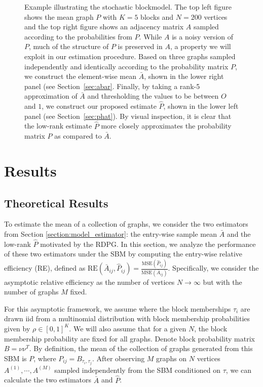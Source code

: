 \documentclass[10pt,letterpaper]{article}
\begin{document}
\begin{figure}
\begin{subfigure}{.4\textwidth}
\end{subfigure}
\caption{Example illustrating the stochastic blockmodel. The top left figure shows the mean graph $P$ with $K = 5$ blocks and $N=200$ vertices and the top right figure shows an adjacency matrix $A$ sampled according to the probabilities from $P$.
While $A$ is a noisy version of $P$, much of the structure of $P$ is preserved in $A$, a property we will exploit in our estimation procedure.
Based on three graphs sampled independently and identically according to the probability matrix $P$, we construct the element-wise mean $\bar{A}$, shown in the lower right panel (see Section~\ref{sec:abar}.  
Finally, by taking a rank-5 approximation of $\bar{A}$ and thresholding the values to be between $O$ and $1$, we construct our proposed estimate $\hat{P}$, shown in the lower left panel (see Section~\ref{sec:phat}).
By visual inspection, it is clear that the low-rank estimate $\hat{P}$ more closely approximates the probability matrix $P$ as compared to $\bar{A}$.
}
\label{fig:SBM_example}
\end{figure}



\section{Results}

\subsection{Theoretical Results}
\label{section:theoretical_result}
To estimate the mean of a collection of graphs, we consider the two estimators from Section \ref{section:model_estimator}: the entry-wise sample mean $\bar{A}$ and the low-rank $\hat{P}$ motivated by the RDPG.
In this section, we analyze the performance of these two estimators under the SBM by computing the entry-wise relative efficiency (RE), defined as $\mathrm{RE}(\bar{A}_{ij}, \hat{P}_{ij}) = \frac{\mathrm{MSE}(\hat{P}_{ij})}{\mathrm{MSE}(\bar{A}_{ij})}$.
Specifically, we consider the asymptotic relative efficiency as the number of vertices $N\to\infty$ but with the number of graphs $M$ fixed.

For this asymptotic framework, we assume where the block memberships $\tau_i$ are drawn iid from a multinomial distribution with block membership probabilities given by $\rho\in[0,1]^K$.
We will also assume that for a given $N$, the block membership probability are fixed for all graphs.
Denote block probability matrix $B = \nu \nu^T$. 
By definition, the mean of the collection of graphs generated from this SBM is $P$, where $P_{ij} = B_{\tau_i, \tau_j}$. After observing $M$ graphs on $N$ vertices $A^{(1)}, \cdots, A^{(M)}$ sampled independently from the SBM conditioned on $\tau$, we can calculate the two estimators $\bar{A}$ and $\hat{P}$.
\end{document}
